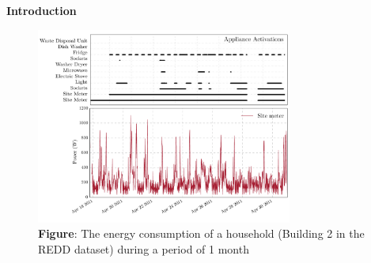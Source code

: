 \documentclass[landscape,fontscale=0.48,margin=2cm,paperwidth=135truecm,paperheight=89truecm]{baposter}
\begin{document}
\begin{poster}
\begin{posterbox}[column=0]{\LARGE \bfseries Introduction}
\begin{figure}
\begin{center}
\includegraphics[width=0.75\textwidth]{Site_Meter}
\caption*{\footnotesize  \textbf{Figure}: The energy consumption of a household (Building 2 in the REDD dataset) during a period of 1 month} \vspace*{-1 cm}
\end{center}
\end{figure}
\vspace{2em}
\end{posterbox}

%



\end{poster}
\end{document}
